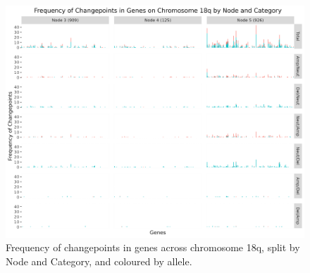 \begin{figure}[!htb]
\centering
\includegraphics[width = 1\textwidth]{../figures/Chapter_6/Chromosome_18q_Barplot_Node.png}
\caption[Frequency of changepoints in genes across chromosome 18q, split by Node and Category, and coloured by allele.]{Frequency of changepoints in genes across chromosome 18q, split by Node and Category, and coloured by allele.}
\label{fig:Barplot_18q}
\end{figure}
